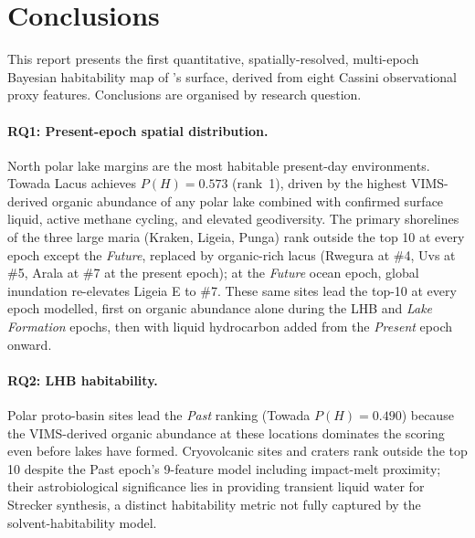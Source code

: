 \section{Conclusions}
\label{sec:conclusions}

This report presents the first quantitative, spatially-resolved, multi-epoch Bayesian habitability map of \titan{}'s surface, derived from eight Cassini observational proxy features.  Conclusions are organised by research question.

\paragraph{RQ1: Present-epoch spatial distribution.}
North polar lake margins are the most habitable present-day environments.  Towada Lacus achieves $P(H)=0.573$ (rank~1), driven by the highest VIMS-derived organic abundance of any polar lake combined with confirmed surface liquid, active methane cycling, and elevated geodiversity.  The primary shorelines of the three large maria (Kraken, Ligeia, Punga) rank outside the top 10 at every epoch except the \textit{Future}, replaced by organic-rich lacus (Rwegura at \#4, Uvs at \#5, Arala at \#7 at the present epoch); at the \textit{Future} ocean epoch, global inundation re-elevates Ligeia E to \#7.  These same sites lead the top-10 at every epoch modelled, first on organic abundance alone during the LHB and \textit{Lake Formation} epochs, then with liquid hydrocarbon added from the \textit{Present} epoch onward.

\paragraph{RQ2: LHB habitability.}
Polar proto-basin sites lead the \textit{Past} ranking (Towada $P(H){=}0.490$) because the VIMS-derived organic abundance at these locations dominates the scoring even before lakes have formed.  Cryovolcanic sites and craters rank outside the top 10 despite the Past epoch's 9-feature model including impact-melt proximity; their astrobiological significance lies in providing transient liquid water for Strecker synthesis, a distinct habitability metric not fully captured by the solvent-habitability model.

